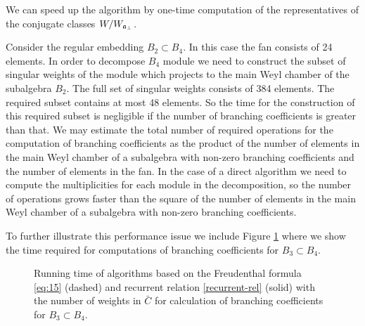 We can speed up the algorithm by
one-time computation of the representatives of the conjugate classes $%
W/W_{\afb }$.


Consider the regular embedding $B_{2}\subset B_{4}$. In this case the fan consists of 24 elements. In order to decompose $B_{4}$ module we need to construct the subset of singular weights of the module which projects to the main Weyl chamber of the subalgebra $B_{2}$. The full set of singular weights consists of 384 elements. The required subset contains at most 48 elements. So the time for the construction of this required subset is negligible if the number of branching coefficients is greater than that. We may estimate the total number of required operations for the computation of branching coefficients as the product of the number of elements in the main Weyl chamber of a subalgebra with non-zero branching coefficients and the number of elements in the fan. In the case of a direct algorithm we need to compute the multiplicities for each module in the decomposition, so the number of operations grows faster than the square of the number of elements in the main Weyl chamber of a subalgebra with non-zero branching coefficients. 

To further illustrate this performance issue we include Figure \ref{fig:branching} where we show the time required for computations of branching coefficients for $B_{3}\subset B_{4}$.

\begin{figure}[h]
  \noindent{}
  \caption{Running time of algorithms based on the Freudenthal formula \eqref{eq:15} (dashed) and recurrent relation \eqref{recurrent-rel} (solid) with the number of weights in $\bar C$ for calculation of branching coefficients for $B_{3}\subset B_{4}$.}
  \label{fig:branching}
\end{figure}


